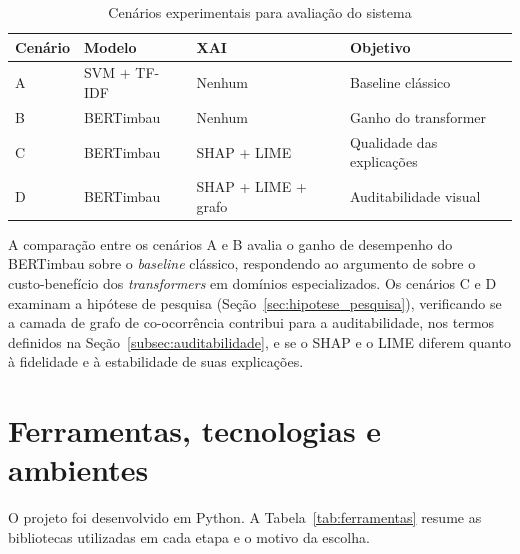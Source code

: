 \documentclass[
    12pt,                %
    openright,           %
    oneside,             %
    a4paper,             %
    english,             %
    brazil               %
]{abntex2}
\begin{document}
\begin{table}[H]
\centering
\caption{Cenários experimentais para avaliação do sistema}
\label{tab:cenarios}
\begin{tabular}{p{1.5cm} p{3.5cm} p{3.5cm} p{4.5cm}}
\toprule
\textbf{Cenário} & \textbf{Modelo} & \textbf{XAI} & \textbf{Objetivo} \\
\midrule
A & SVM + TF-IDF & Nenhum & Baseline clássico \\
B & BERTimbau & Nenhum & Ganho do transformer \\
C & BERTimbau & SHAP + LIME & Qualidade das explicações \\
D & BERTimbau & SHAP + LIME + grafo & Auditabilidade visual \\
\bottomrule
\end{tabular}
\end{table}

A comparação entre os cenários A e B avalia o ganho de desempenho do BERTimbau sobre o \textit{baseline} clássico, respondendo ao argumento de 
 sobre o custo-benefício dos \textit{transformers} em domínios especializados. Os cenários C e D examinam a hipótese de pesquisa (Seção~\ref{sec:hipotese_pesquisa}), verificando se a camada de grafo de co-ocorrência contribui para a auditabilidade, nos termos definidos na Seção~\ref{subsec:auditabilidade}, e se o SHAP e o LIME diferem quanto à fidelidade e à estabilidade de suas explicações.

\section{Ferramentas, tecnologias e ambientes}
\label{sec:ferramentas}

O projeto foi desenvolvido em Python. A Tabela~\ref{tab:ferramentas} resume as bibliotecas utilizadas em cada etapa e o motivo da escolha.
\end{document}
